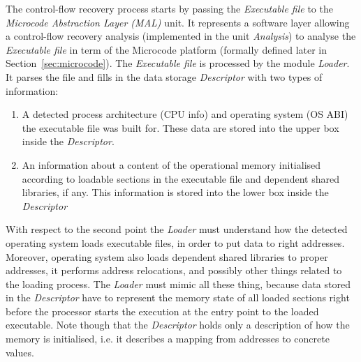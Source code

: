 \documentclass[10pt,twocolumn]{article}
\begin{document}
The control-flow recovery process starts by passing the \emph{Executable file}
to the \emph{Microcode Abstraction Layer (MAL)} unit. It represents a software
layer allowing a control-flow recovery analysis (implemented in the unit
\emph{Analysis}) to analyse the \emph{Executable file} in term of the Microcode
platform (formally defined later in Section~\ref{sec:microcode}). The
\emph{Executable file} is processed by the module \emph{Loader}. It parses the
file and fills in the data storage \emph{Descriptor} with two types of
information:
\begin{enumerate}
\item A detected process architecture (CPU info) and operating system (OS ABI)
the executable file was built for. These data are stored into the upper box
inside the \emph{Descriptor}. %
\item An information about a content of the operational memory initialised
according to loadable sections in the executable file and dependent shared
libraries, if any. This information is stored into the  lower box inside the
\emph{Descriptor} %
\end{enumerate}
With respect to the second point the \emph{Loader} must understand how the
detected operating system loads executable files, in order to put data to right
addresses. Moreover, operating system also loads dependent shared libraries to
proper addresses, it performs address relocations, and possibly other things
related to the loading process. The \emph{Loader} must mimic all these thing,
because data stored in the \emph{Descriptor} have to represent the memory state
of all loaded sections right before the processor starts the execution at the
entry point to the loaded executable. Note though that the \emph{Descriptor}
holds only a description of how the memory is initialised, i.e. it describes a
mapping from addresses to concrete values.
\end{document}
